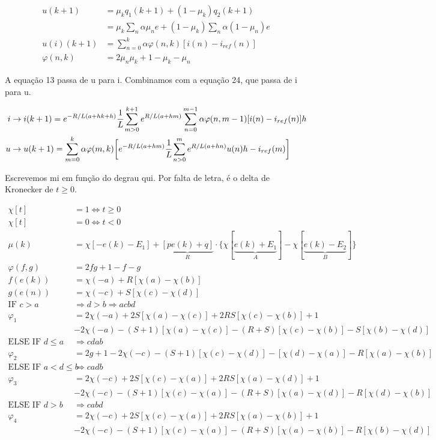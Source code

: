 \documentclass[12pt]{article}
\begin{document}
\begin{align}
u(k+1) &= \mu_k q_1(k+1) + (1 - \mu_k) q_2(k+1) \\
&= \mu_k \sum_n \alpha \mu_n e + (1 - \mu_k) \sum_n \alpha (1 - \mu_n) e \\
u(i)(k+1) &= \sum_{n = 0}^k \alpha \varphi(n,k) [i(n) - i_{ref}(n)] \\
\varphi(n, k) &= 2 \mu_n \mu_k + 1 - \mu_k - \mu_n
\end{align}

A equa\c{c}\~ao 13 passa de u para i. Combinamos com a equa\c{c}\~ao 24, que passa de i para u.

\begin{align}
i &\to i(k+ 1) = e^{-R/L (a + hk + h)}\cfrac{1}{L}\sum_{m > 0}^{k + 1} e^{R/L (a + hm)}  \sum_{n = 0}^{m - 1} \alpha \varphi(n,m-1) [i(n) - i_{ref}(n)] h \\
u &\to u(k + 1) = \sum_{m = 0}^k \alpha \varphi(m,k) \bigg[e^{-R/L (a + hm)}\cfrac{1}{L}\sum_{n > 0}^m e^{R/L (a + hn)} u(n) h - i_{ref}(m)\bigg]
\end{align}

Escrevemos mi em fun\c{c}\~ao do degrau qui. Por falta de letra, \'e o delta de Kronecker de $t \ge 0$.

\begin{align}
  \chi[t] &= 1 \Leftrightarrow t \ge 0 \\
  \chi[t] &= 0 \Leftrightarrow t < 0 \\
  \mu(k) &= \chi[-e(k) - E_1] + \underbrace{[pe(k) + q]}_R\cdot \{ \chi[\underbrace{e(k) + E_1}_A] - \chi[\underbrace{e(k) - E_2}_B] \} \\
  \varphi(f, g) &= 2fg + 1 - f - g \\
  f(e(k)) &= \chi(-a) + R[\chi(a) - \chi(b)] \\
  g(e(n)) &= \chi(-c) + S[\chi(c) - \chi(d)] \\
  \text{IF }c > a &\Rightarrow d> b \Rightarrow acbd \\
  \varphi_1 &= 2 \chi(-a) + 2 S [\chi(a) - \chi(c)] + 2 RS [\chi(c) - \chi(b)] + 1 \\
&- 2 \chi(-a) - (S + 1) [\chi(a) - \chi(c)] - (R + S) [\chi(c) - \chi(b)] - S [\chi(b) - \chi(d)] \\
  \text{ELSE IF }d \le a &\Rightarrow cdab \\
    \varphi_2 &= 2g + 1 - 2 \chi(-c) - (S + 1) [\chi(c) - \chi(d)] - [\chi(d) - \chi(a)] - R [\chi(a) - \chi(b)] \\
  \text{ELSE IF }a < d \le b &\Rightarrow cadb \\
    \varphi_3 &= 2 \chi(-c) + 2 S [\chi(c) - \chi(a)] + 2 RS [\chi(a) - \chi(d)] + 1 \\
&- 2 \chi(-c) - (S + 1) [\chi(c) - \chi(a)] - (R + S) [\chi(a) - \chi(d)] - R [\chi(d) - \chi(b)] \\
  \text{ELSE IF }d > b &\Rightarrow cabd\\
  \varphi_4 &= 2 \chi(-c) + 2 S [\chi(c) - \chi(a)] + 2 RS [\chi(a) - \chi(b)] + 1\\
&- 2 \chi(-c) - (S + 1) [\chi(c) - \chi(a)] - (R + S) [\chi(a) - \chi(b)] - R [\chi(b) - \chi(d)]
\end{align}
\end{document}
